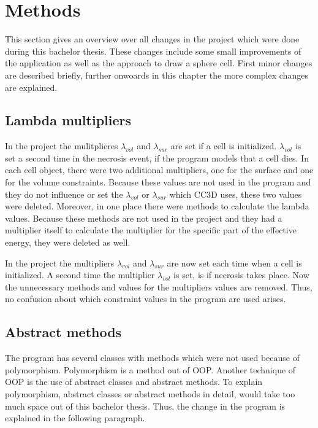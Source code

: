 \chapter{Methods}

    
    
This section gives an overview over all changes in the project which were done during this bachelor thesis. These changes include some small improvements of the application as well as the approach to draw a sphere cell. First minor changes are described briefly, further onwoards in this chapter the more complex changes are explained. 

\section{Lambda multipliers} \label{sec:LambdaMultipliers}
In the project the mulitplieres $\lambda_{vol}$ and $\lambda_{sur}$ are set if a cell is initialized. $\lambda_{vol}$ is set a second time in the necrosis event, if the program models that a cell dies. \newline
In each cell object, there were two additional multipliers, one for the surface and one for the volume constraints. Because these values are not used in the program and they do not influence or set the $\lambda_{vol}$ or $\lambda_{sur}$ which \ac{CC3D} uses, these two values were deleted. Moreover, in one place there were methods to calculate the lambda values. Because these methods are not used in the project and they had a multiplier itself to calculate the multiplier for the specific part of the effective energy, they were deleted as well. 

In the project the multipliers $\lambda_{vol}$ and $\lambda_{sur}$ are now set each time when a cell is initialized. A second time the multiplier $\lambda_{vol}$ is set, is if necrosis takes place. Now the unnecessary methods and values for the multipliers values are removed. Thus, no confusion about which constraint values in the program are used arises.

\section{Abstract methods}\label{sec:AbstractMethods}
The program has several classes with methods which were not used because of polymorphism. Polymorphism is a method out of \ac{OOP}. Another technique of \ac{OOP} is the use of abstract classes and abstract methods. To explain polymorphism, abstract classes or abstract methods in detail, would take too much space out of this bachelor thesis. Thus, the change in the program is explained in the following paragraph.

